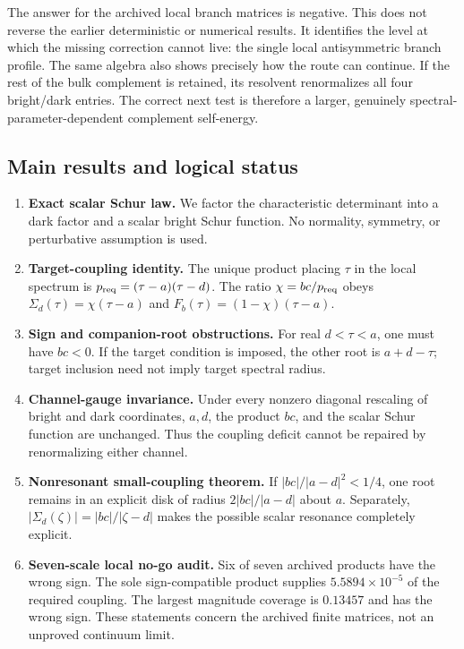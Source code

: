 \documentclass[11pt]{article}
\theoremstyle{definition}
\theoremstyle{remark}
\begin{document}
The answer for the archived local branch matrices is negative.  This does
not reverse the earlier deterministic or numerical results.  It identifies
the level at which the missing correction cannot live: the single local
antisymmetric branch profile.  The same algebra also shows precisely how
the route can continue.  If the rest of the bulk complement is retained,
its resolvent renormalizes all four bright/dark entries.  The correct next
test is therefore a larger, genuinely spectral-parameter-dependent
complement self-energy.

\subsection*{Main results and logical status}

\begin{enumerate}[label=\textbf{S\arabic*.},leftmargin=3.2em]
 \item \textbf{Exact scalar Schur law.}
 We factor the characteristic determinant into a dark factor and a scalar
 bright Schur function.  No normality, symmetry, or perturbative assumption
 is used.

 \item \textbf{Target-coupling identity.}
 The unique product placing $\tau$ in the local spectrum is
 $p_{\rm req}=(\tau-a)(\tau-d)$.  The ratio
 $\chi=bc/p_{\rm req}$ obeys
 $\Sigma_d(\tau)=\chi(\tau-a)$ and
 $F_b(\tau)=(1-\chi)(\tau-a)$.

 \item \textbf{Sign and companion-root obstructions.}
 For real $d<\tau<a$, one must have $bc<0$.  If the target condition is
 imposed, the other root is $a+d-\tau$; target inclusion need not imply
 target spectral radius.

 \item \textbf{Channel-gauge invariance.}
 Under every nonzero diagonal rescaling of bright and dark coordinates,
 $a,d$, the product $bc$, and the scalar Schur function are unchanged.
 Thus the coupling deficit cannot be repaired by renormalizing either
 channel.

 \item \textbf{Nonresonant small-coupling theorem.}
 If $|bc|/|a-d|^2<1/4$, one root remains in an explicit disk of radius
 $2|bc|/|a-d|$ about $a$.  Separately,
 $|\Sigma_d(\zeta)|=|bc|/|\zeta-d|$ makes the possible scalar resonance
 completely explicit.

 \item \textbf{Seven-scale local no-go audit.}
 Six of seven archived products have the wrong sign.  The sole
 sign-compatible product supplies $5.5894\times10^{-5}$ of the required
 coupling.  The largest magnitude coverage is $0.13457$ and has the wrong
 sign.  These statements concern the archived finite matrices, not an
 unproved continuum limit.


\end{enumerate}
\end{document}
